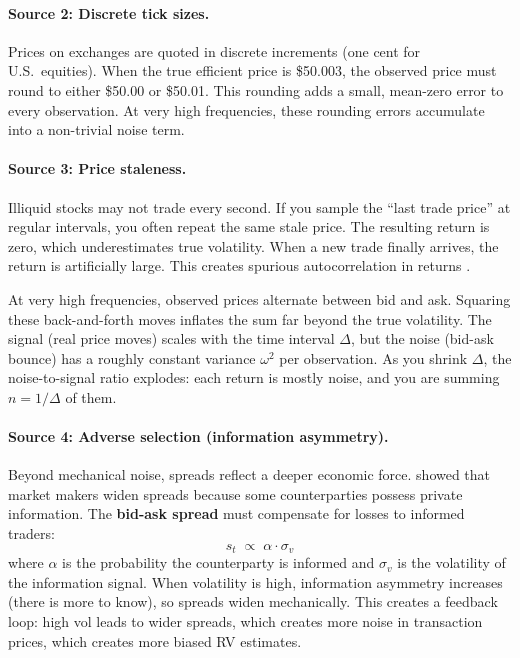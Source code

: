 \paragraph{Source 2: Discrete tick sizes.}
Prices on exchanges are quoted in discrete increments (one cent for U.S.\ equities).
When the true efficient price is \$50.003, the observed price must round to either \$50.00 or \$50.01.
This rounding adds a small, mean-zero error to every observation.
At very high frequencies, these rounding errors accumulate into a non-trivial noise term.

\paragraph{Source 3: Price staleness.}
Illiquid stocks may not trade every second.
If you sample the ``last trade price'' at regular intervals, you often repeat the same stale price.
The resulting return is zero, which underestimates true volatility.
When a new trade finally arrives, the return is artificially large.
This creates spurious autocorrelation in returns \citep{AitSahaliaMyklandZhang2005}.

\begin{intuition}
At very high frequencies, observed prices alternate between bid and ask.
Squaring these back-and-forth moves inflates the sum far beyond the true volatility.
The signal (real price moves) scales with the time interval $\Delta$, but the noise (bid-ask bounce) has a roughly constant variance $\omega^2$ per observation.
As you shrink $\Delta$, the noise-to-signal ratio explodes: each return is mostly noise, and you are summing $n = 1/\Delta$ of them.
\end{intuition}

\paragraph{Source 4: Adverse selection (information asymmetry).}
Beyond mechanical noise, spreads reflect a deeper economic force.
\citet{GlostenMilgrom1985} showed that market makers widen spreads because some counterparties possess private information.
The \textbf{bid-ask spread} must compensate for losses to informed traders:
\[
  s_t \;\propto\; \alpha \cdot \sigma_v
\]
where $\alpha$ is the probability the counterparty is informed and $\sigma_v$ is the volatility of the information signal.
When volatility is high, information asymmetry increases (there is more to know), so spreads widen mechanically.
This creates a feedback loop: high vol leads to wider spreads, which creates more noise in transaction prices, which creates more biased RV estimates.

